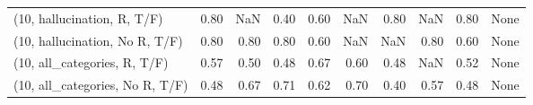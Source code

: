 \begin{table*}[h!]
\begin{adjustbox}{width=2\columnwidth,center}
\begin{tabular}{lrrr|rrr|rrr}
(10, hallucination, R, T/F)           &                      0.80 &                   NaN &                      0.40 &                          0.60 &                       NaN &                          0.80 &                                    NaN &                               0.80 &                                  None \\
(10, hallucination, No R, T/F)        &                      0.80 &                  0.80 &                      0.80 &                          0.60 &                       NaN &                           NaN &                                   0.80 &                               0.60 &                                  None \\
(10, all\_categories, R, T/F)          &                      0.57 &                  0.50 &                      0.48 &                          0.67 &                      0.60 &                          0.48 &                                    NaN &                               0.52 &                                  None \\
(10, all\_categories, No R, T/F)       &                      0.48 &                  0.67 &                      0.71 &                          0.62 &                      0.70 &                          0.40 &                                   0.57 &                               0.48 &                                  None \\




\end{tabular}
\end{adjustbox}
\end{table*}
